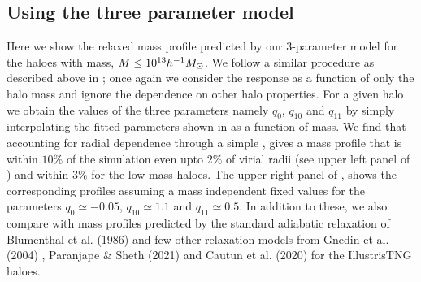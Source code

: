 \subsection{Using the three parameter model}
\label{sec:apndx-demo-ch:z0main}
Here we show the relaxed mass profile predicted by our 3-parameter model  for the haloes with mass, $M\leq10^{13}h^{-1}M_{\odot}$. We follow a similar procedure as described above in ; once again we consider the response as a function of only the halo mass and ignore the dependence on other halo properties. For a given halo we obtain the values of the three parameters namely $q_0$, $q_{10}$ and $q_{11}$ by simply interpolating the fitted parameters shown in  as a function of mass. We find that accounting for radial dependence through a simple , gives a mass profile that is within $10\%$ of the simulation even upto $2 \%$ of virial radii (see upper left panel of ) and within $3 \%$ for the low mass haloes. The upper right panel of , shows the corresponding profiles assuming a mass independent fixed values for the parameters $q_0\simeq-0.05$, $q_{10}\simeq1.1$ and $q_{11}\simeq0.5$. In addition to these, we also compare with mass profiles predicted by the standard adiabatic relaxation of Blumenthal et al. (1986) \citep{1986ApJ...301...27B} and few other relaxation models from Gnedin et al. (2004) \citep{2004ApJ...616...16G}, Paranjape $\&$ Sheth (2021) \citep{2021MNRAS.507..632P} and Cautun et al. (2020) \citep{2020MNRAS.494.4291C} for the IllustrisTNG haloes.


